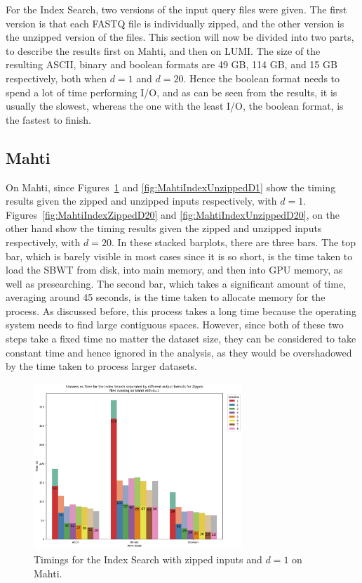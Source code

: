 For the Index Search, two versions of the input query files were given.
The first version is that each FASTQ file is individually zipped, and the other version is the unzipped version of the files.
This section will now be divided into two parts, to describe the results first on Mahti, and then on LUMI.
The size of the resulting ASCII, binary and boolean formats are 49 GB, 114 GB, and 15 GB respectively, both when $d=1$ and $d=20$.
Hence the boolean format needs to spend a lot of time performing I/O, and as can be seen from the results, it is usually the slowest, whereas the one with the least I/O, the boolean format, is the fastest to finish.

\subsection{Mahti}

On Mahti, since Figures~\ref{fig:MahtiIndexZippedD1} and \ref{fig:MahtiIndexUnzippedD1} show the timing results given the zipped and unzipped inputs respectively, with $d=1$.
Figures~\ref{fig:MahtiIndexZippedD20} and \ref{fig:MahtiIndexUnzippedD20}, on the other hand show the timing results given the zipped and unzipped inputs respectively, with $d=20$.
In these stacked barplots, there are three bars.
The top bar, which is barely visible in most cases since it is so short, is the time taken to load the SBWT from disk, into main memory, and then into GPU memory, as well as presearching.
The second bar, which takes a significant amount of time, averaging around 45 seconds, is the time taken to allocate memory for the process.
As discussed before, this process takes a long time because the operating system needs to find large contiguous spaces.
However, since both of these two steps take a fixed time no matter the dataset size, they can be considered to take constant time and hence ignored in the analysis, as they would be overshadowed by the time taken to process larger datasets.

\begin{figure}[t]
  \centering
  \includegraphics[width=0.7\textwidth]{images/MahtiIndexZippedD1.png}
  \caption{Timings for the Index Search with zipped inputs and $d=1$ on Mahti.}\label{fig:MahtiIndexZippedD1}
\end{figure}


